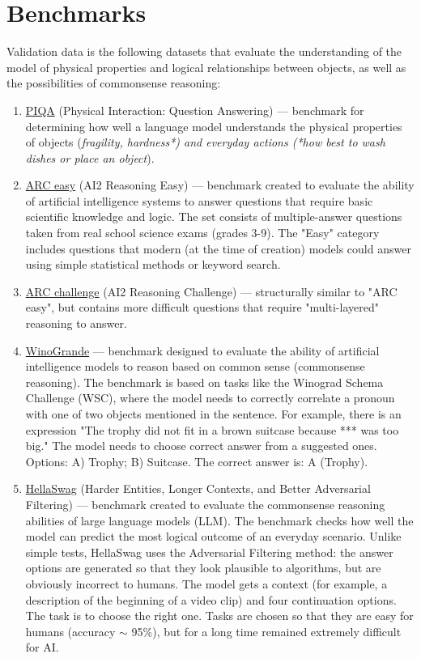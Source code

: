 \documentclass{report}
\begin{document}
\section{Benchmarks}
Validation data is the following datasets that evaluate the understanding of the model of physical properties and logical relationships between objects, as well as the possibilities of commonsense reasoning:
\begin{enumerate}
    \item \href{https://github.com/EleutherAI/lm-evaluation-harness/tree/main/lm_eval/tasks/piqa}{PIQA} (Physical Interaction: Question Answering) — benchmark for determining how well a language model understands the physical properties of objects (\textit{fragility, hardness*) and everyday actions (*how best to wash dishes or place an object}). 
    \item \href{https://github.com/EleutherAI/lm-evaluation-harness/tree/main/lm_eval/tasks/arc}{ARC easy} (AI2 Reasoning Easy) — benchmark created to evaluate the ability of artificial intelligence systems to answer questions that require basic scientific knowledge and logic. The set consists of multiple-answer questions taken from real school science exams (grades 3-9). The "Easy" category includes questions that modern (at the time of creation) models could answer using simple statistical methods or keyword search.
    \item \href{https://github.com/EleutherAI/lm-evaluation-harness/tree/main/lm_eval/tasks/arc}{ARC challenge} (AI2 Reasoning Challenge) — structurally similar to "ARC easy", but contains more difficult questions that require "multi-layered" reasoning to answer.
    \item \href{https://github.com/EleutherAI/lm-evaluation-harness/tree/main/lm_eval/tasks/winogrande}{WinoGrande} — benchmark designed to evaluate the ability of artificial intelligence models to reason based on common sense (commonsense reasoning). The benchmark is based on tasks like the Winograd Schema Challenge (WSC), where the model needs to correctly correlate a pronoun with one of two objects mentioned in the sentence. For example, there is an expression "The trophy did not fit in a brown suitcase because *** was too big." The model needs to choose correct answer from a suggested ones. Options: A) Trophy; B) Suitcase. The correct answer is: A (Trophy).
    \item \href{https://github.com/EleutherAI/lm-evaluation-harness/tree/main/lm_eval/tasks/hellaswag}{HellaSwag} (Harder Entities, Longer Contexts, and Better Adversarial Filtering) — benchmark created to evaluate the commonsense reasoning abilities of large language models (LLM). The benchmark checks how well the model can predict the most logical outcome of an everyday scenario. Unlike simple tests, HellaSwag uses the Adversarial Filtering method: the answer options are generated so that they look plausible to algorithms, but are obviously incorrect to humans. The model gets a context (for example, a description of the beginning of a video clip) and four continuation options. The task is to choose the right one. Tasks are chosen so that they are easy for humans (accuracy $\sim$ 95\%), but for a long time remained extremely difficult for AI.

\end{enumerate}
\end{document}

